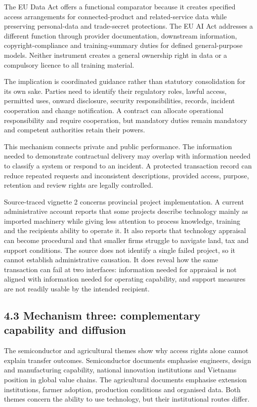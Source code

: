 \documentclass[
]{article}
\begin{document}
The EU Data Act offers a functional comparator because it creates
specified access arrangements for connected-product and related-service
data while preserving personal-data and trade-secret protections. The EU
AI Act addresses a different function through provider documentation,
downstream information, copyright-compliance and training-summary duties
for defined general-purpose models. Neither instrument creates a general
ownership right in data or a compulsory licence to all training
material.

The implication is coordinated guidance rather than statutory
consolidation for its own sake. Parties need to identify their
regulatory roles, lawful access, permitted uses, onward disclosure,
security responsibilities, records, incident cooperation and change
notification. A contract can allocate operational responsibility and
require cooperation, but mandatory duties remain mandatory and competent
authorities retain their powers.

This mechanism connects private and public performance. The information
needed to demonstrate contractual delivery may overlap with information
needed to classify a system or respond to an incident. A protected
transaction record can reduce repeated requests and inconsistent
descriptions, provided access, purpose, retention and review rights are
legally controlled.

Source-traced vignette 2 concerns provincial project implementation. A
current administrative account reports that some projects describe
technology mainly as imported machinery while giving less attention to
process knowledge, training and the recipient\textquotesingle s ability
to operate it. It also reports that technology appraisal can become
procedural and that smaller firms struggle to navigate land, tax and
support conditions. The source does not identify a single failed
project, so it cannot establish administrative causation. It does reveal
how the same transaction can fail at two interfaces: information needed
for appraisal is not aligned with information needed for operating
capability, and support measures are not readily usable by the intended
recipient.

\subsection{4.3 Mechanism three: complementary capability and
diffusion}\label{mechanism-three-complementary-capability-and-diffusion}

The semiconductor and agricultural themes show why access rights alone
cannot explain transfer outcomes. Semiconductor documents emphasise
engineers, design and manufacturing capability, national innovation
institutions and Vietnam\textquotesingle s position in global value
chains. The agricultural documents emphasise extension institutions,
farmer adoption, production conditions and organised data. Both themes
concern the ability to use technology, but their institutional routes
differ.
\end{document}
